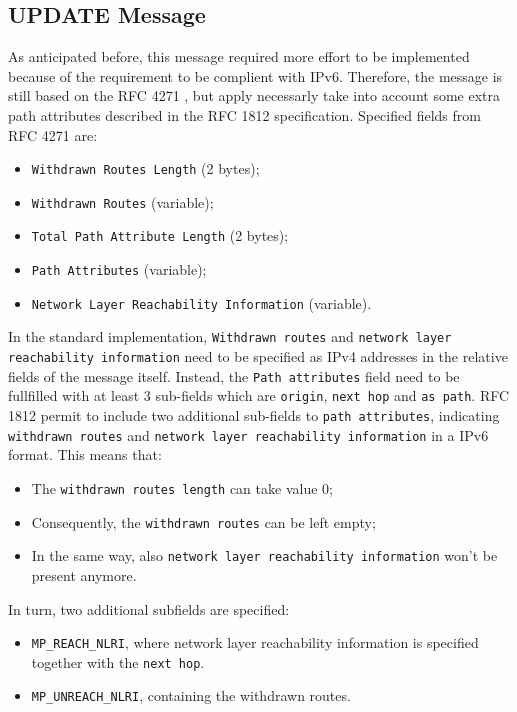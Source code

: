 \subsection{UPDATE Message}
As anticipated before, this message required more effort to be implemented because of the requirement to be complient with IPv6.
Therefore, the message is still based on the RFC 4271 \cite{rfc4271}, but apply necessarly take into account some extra path attributes described in the RFC 1812 \cite{rfc1812} specification.
Specified fields from RFC 4271 are:
\begin{itemize}
    \item \texttt{Withdrawn Routes Length} (2 bytes);
    \item \texttt{Withdrawn Routes} (variable);
    \item \texttt{Total Path Attribute Length} (2 bytes);
    \item \texttt{Path Attributes} (variable);
    \item \texttt{Network Layer Reachability Information} (variable).
\end{itemize}
In the standard implementation, \texttt{Withdrawn routes} and \texttt{network layer reachability information} need to be specified as IPv4 addresses in the relative fields of the message itself. Instead, the \texttt{Path attributes} field need to be fullfilled with at least 3 sub-fields which are \texttt{origin}, \texttt{next hop} and \texttt{as path}.
RFC 1812 permit to include two additional sub-fields to \texttt{path attributes}, indicating \texttt{withdrawn routes} and \texttt{network layer reachability information} in a IPv6 format.
This means that:
\begin{itemize}
    \item The \texttt{withdrawn routes length} can take value 0;
    \item Consequently, the \texttt{withdrawn routes} can be left empty;
    \item In the same way, also \texttt{network layer reachability information} won't be present anymore.
\end{itemize}
In turn, two additional subfields are specified:
\begin{itemize}
    \item \texttt{MP\_REACH\_NLRI}, where network layer reachability information is specified together with the \texttt{next hop}.
    \item \texttt{MP\_UNREACH\_NLRI}, containing the withdrawn routes.
\end{itemize}

